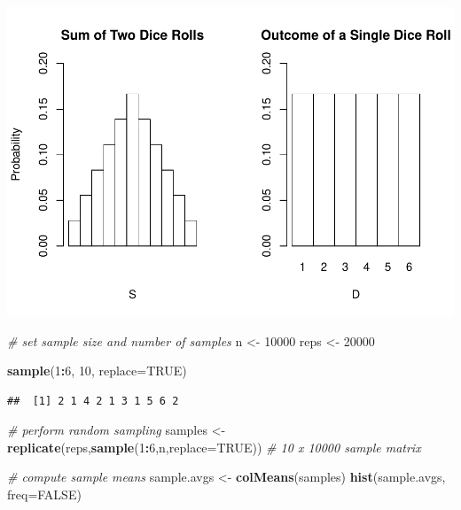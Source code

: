\documentclass[
]{book}
\newenvironment{Shaded}{\begin{snugshade}}{\end{snugshade}}
\newcommand{\CommentTok}[1]{\textcolor[rgb]{0.56,0.35,0.01}{\textit{#1}}}
\newcommand{\DataTypeTok}[1]{\textcolor[rgb]{0.13,0.29,0.53}{#1}}
\newcommand{\DecValTok}[1]{\textcolor[rgb]{0.00,0.00,0.81}{#1}}
\newcommand{\KeywordTok}[1]{\textcolor[rgb]{0.13,0.29,0.53}{\textbf{#1}}}
\newcommand{\NormalTok}[1]{#1}
\newcommand{\OperatorTok}[1]{\textcolor[rgb]{0.81,0.36,0.00}{\textbf{#1}}}
\newcommand{\OtherTok}[1]{\textcolor[rgb]{0.56,0.35,0.01}{#1}}
\newcommand{\StringTok}[1]{\textcolor[rgb]{0.31,0.60,0.02}{#1}}
\begin{document}
\includegraphics{Metrics_files/figure-latex/unnamed-chunk-13-1.pdf}

\begin{Shaded}
\begin{Highlighting}[]
\CommentTok{# set sample size and number of samples}
\NormalTok{n <-}\StringTok{ }\DecValTok{10000}
\NormalTok{reps <-}\StringTok{ }\DecValTok{20000}

\KeywordTok{sample}\NormalTok{(}\DecValTok{1}\OperatorTok{:}\DecValTok{6}\NormalTok{, }\DecValTok{10}\NormalTok{, }\DataTypeTok{replace=}\OtherTok{TRUE}\NormalTok{)}
\end{Highlighting}
\end{Shaded}

\begin{verbatim}
##  [1] 2 1 4 2 1 3 1 5 6 2
\end{verbatim}

\begin{Shaded}
\begin{Highlighting}[]
\CommentTok{# perform random sampling}
\NormalTok{samples <-}\StringTok{ }\KeywordTok{replicate}\NormalTok{(reps,}\KeywordTok{sample}\NormalTok{(}\DecValTok{1}\OperatorTok{:}\DecValTok{6}\NormalTok{,n,}\DataTypeTok{replace=}\OtherTok{TRUE}\NormalTok{)) }\CommentTok{# 10 x 10000 sample matrix}

\CommentTok{# compute sample means}
\NormalTok{sample.avgs <-}\StringTok{ }\KeywordTok{colMeans}\NormalTok{(samples)}
\KeywordTok{hist}\NormalTok{(sample.avgs, }\DataTypeTok{freq=}\OtherTok{FALSE}\NormalTok{)}
\end{Highlighting}
\end{Shaded}
\end{document}
